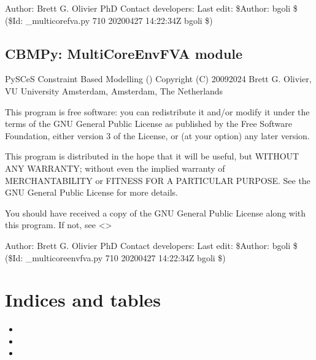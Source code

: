 \documentclass[letterpaper,10pt,english]{sphinxmanual}
\begin{document}
\sphinxAtStartPar
Author: Brett G. Olivier PhD
Contact developers: 
Last edit: \$Author: bgoli \$ (\$Id: \_multicorefva.py 710 2020\sphinxhyphen{}04\sphinxhyphen{}27 14:22:34Z bgoli \$)
\label{\detokenize{modules_doc:module-cbmpy._multicoreenvfva}}

\section{CBMPy: MultiCoreEnvFVA module}
\label{\detokenize{modules_doc:cbmpy-multicoreenvfva-module}}
\sphinxAtStartPar
PySCeS Constraint Based Modelling ()
Copyright (C) 2009\sphinxhyphen{}2024 Brett G. Olivier, VU University Amsterdam, Amsterdam, The Netherlands

\sphinxAtStartPar
This program is free software: you can redistribute it and/or modify
it under the terms of the GNU General Public License as published by
the Free Software Foundation, either version 3 of the License, or
(at your option) any later version.

\sphinxAtStartPar
This program is distributed in the hope that it will be useful,
but WITHOUT ANY WARRANTY; without even the implied warranty of
MERCHANTABILITY or FITNESS FOR A PARTICULAR PURPOSE.  See the
GNU General Public License for more details.

\sphinxAtStartPar
You should have received a copy of the GNU General Public License
along with this program.  If not, see \textless{}\textgreater{}

\sphinxAtStartPar
Author: Brett G. Olivier PhD
Contact developers: 
Last edit: \$Author: bgoli \$ (\$Id: \_multicoreenvfva.py 710 2020\sphinxhyphen{}04\sphinxhyphen{}27 14:22:34Z bgoli \$)
\label{\detokenize{modules_doc:module-cbmpy.miriamids}}

\chapter{Indices and tables}
\label{\detokenize{cbmpy:indices-and-tables}}\begin{itemize}
\item {} 
\sphinxAtStartPar
{}

\item {} 
\sphinxAtStartPar
{}

\item {} 
\sphinxAtStartPar
{}

\end{itemize}
\end{document}

